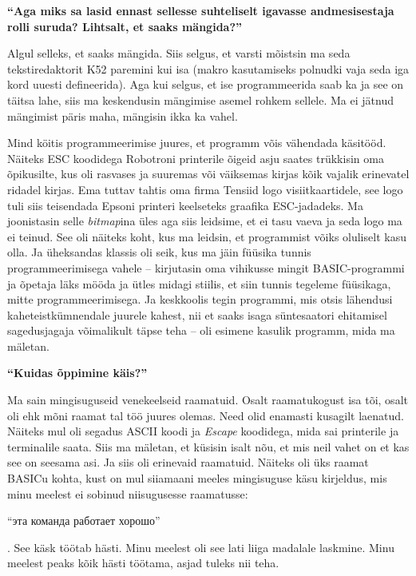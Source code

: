 \textbf{\enquote{Aga miks sa lasid ennast sellesse suhteliselt igavasse
andmesisestaja rolli suruda? Lihtsalt, et saaks mängida?}}

Algul selleks, et saaks mängida. Siis selgus, et varsti mõistsin ma seda
tekstiredaktorit K52 paremini kui isa (makro kasutamiseks polnudki vaja seda
iga kord uuesti defineerida). Aga kui selgus, et ise programmeerida saab ka ja
see on täitsa lahe, siis ma keskendusin mängimise asemel rohkem sellele. Ma ei
jätnud mängimist päris maha, mängisin ikka ka vahel.

Mind köitis programmeerimise juures, et programm võis vähendada käsitööd.
Näiteks ESC koodidega Robotroni printerile õigeid asju saates trükkisin oma õpikusilte, kus oli
rasvases ja suuremas või väiksemas kirjas kõik vajalik erinevatel ridadel
kirjas. Ema tuttav tahtis oma firma Tensiid logo visiitkaartidele, see logo tuli
siis teisendada Epsoni printeri keelseteks graafika ESC-jadadeks. Ma joonistasin selle
\emph{bitmap}ina üles aga siis leidsime, et ei tasu vaeva ja seda logo ma ei
teinud. See oli näiteks koht, kus ma leidsin, et programmist võiks oluliselt
kasu olla. Ja üheksandas klassis oli seik, kus ma jäin füüsika tunnis
programmeerimisega vahele -- kirjutasin oma vihikusse mingit BASIC-programmi ja
õpetaja läks mööda ja ütles midagi stiilis, et siin tunnis tegeleme füüsikaga,
mitte programmeerimisega. Ja keskkoolis tegin programmi, mis otsis lähendusi
kaheteistkümnendale juurele kahest, nii et saaks isaga süntesaatori ehitamisel
sagedusjagaja võimalikult täpse teha -- oli esimene kasulik programm, mida ma mäletan.

\textbf{\enquote{Kuidas õppimine käis?}}

Ma sain mingisuguseid venekeelseid raamatuid. Osalt raamatukogust isa tõi,
osalt oli ehk mõni raamat tal töö juures olemas. Need olid enamasti kusagilt
laenatud. Näiteks mul oli segadus ASCII koodi ja \emph{Escape} koodidega, mida
sai printerile ja terminalile saata. Siis ma mäletan, et küsisin isalt nõu, et
mis neil vahet on et kas see on seesama asi. Ja siis oli erinevaid raamatuid.
Näiteks oli üks raamat BASICu kohta, kust on mul siiamaani meeles mingisuguse
käsu kirjeldus, mis minu meelest ei sobinud niisugusesse raamatusse:
\begin{russian}\enquote{эта команда работает хорошо}\end{russian}. See käsk
töötab hästi. Minu meelest oli see lati liiga madalale laskmine. Minu meelest
peaks kõik hästi töötama, asjad tuleks nii teha.

